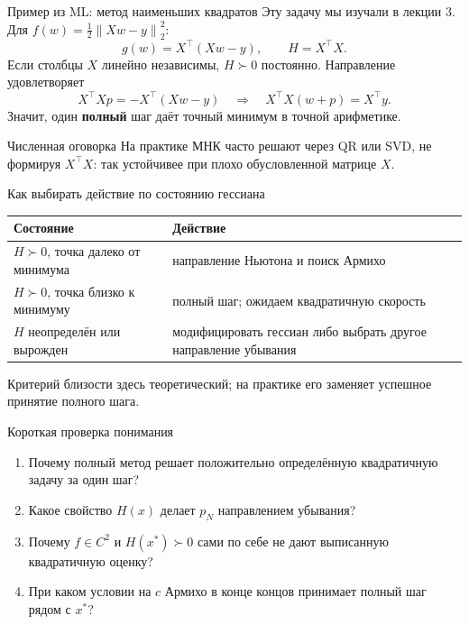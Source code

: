 \documentclass[aspectratio=169,10pt]{beamer}
\newcommand{\norm}[1]{\left\lVert #1\right\rVert}
\begin{document}
\begin{frame}{Пример из ML: метод наименьших квадратов}
\small
Эту задачу мы изучали в лекции 3. Для $f(w)=\frac12\norm{Xw-y}_2^2$:
\[
g(w)=X^\top(Xw-y),\qquad H=X^\top X.
\]
Если столбцы $X$ линейно независимы, $H\succ0$ постоянно. Направление удовлетворяет
\[
X^\top Xp=-X^\top(Xw-y)
\quad\Longrightarrow\quad X^\top X(w+p)=X^\top y.
\]
Значит, один \textbf{полный} шаг даёт точный минимум в точной арифметике.
\begin{alertblock}{Численная оговорка}
На практике МНК часто решают через QR или SVD, не формируя $X^\top X$: так устойчивее при плохо обусловленной матрице $X$.
\end{alertblock}
\end{frame}

\begin{frame}{Как выбирать действие по состоянию гессиана}
\small
\begin{tabular}{@{}p{.29\linewidth}p{.60\linewidth}@{}}
\toprule
Состояние & Действие\\
\midrule
$H\succ0$, точка далеко от минимума & направление Ньютона и поиск Армихо\\
$H\succ0$, точка близко к минимуму & полный шаг; ожидаем квадратичную скорость\\
$H$ неопределён или вырожден & модифицировать гессиан либо выбрать другое направление убывания\\
\bottomrule
\end{tabular}

\par\vspace{.5em}
Критерий близости здесь теоретический; на практике его заменяет успешное принятие полного шага.
\end{frame}

\begin{frame}{Короткая проверка понимания}
\small
\begin{enumerate}
\item Почему полный метод решает положительно определённую квадратичную задачу за один шаг?
\item Какое свойство $H(x)$ делает $p_N$ направлением убывания?
\item Почему $f\in C^2$ и $H(x^*)\succ0$ сами по себе не дают выписанную квадратичную оценку?
\item При каком условии на $c$ Армихо в конце концов принимает полный шаг рядом с $x^*$?
\end{enumerate}
\end{frame}
\end{document}
